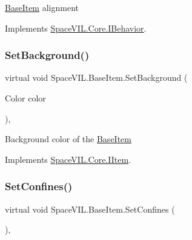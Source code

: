 \mbox{\hyperlink{class_space_v_i_l_1_1_base_item}{Base\+Item}} alignment 



Implements \mbox{\hyperlink{interface_space_v_i_l_1_1_core_1_1_i_behavior}{Space\+V\+I\+L.\+Core.\+I\+Behavior}}.

\mbox{\label{class_space_v_i_l_1_1_base_item_a9ac74dbeeaedbc9dc13edbad28ee1d8c}} 
\subsubsection{\texorpdfstring{Set\+Background()}{SetBackground()}}
{\footnotesize\ttfamily virtual void Space\+V\+I\+L.\+Base\+Item.\+Set\+Background (\begin{DoxyParamCaption}\item[{Color}]{color }\end{DoxyParamCaption})\hspace{0.3cm}{\ttfamily [inline]}, {\ttfamily [virtual]}}



Background color of the \mbox{\hyperlink{class_space_v_i_l_1_1_base_item}{Base\+Item}} 



Implements \mbox{\hyperlink{interface_space_v_i_l_1_1_core_1_1_i_item}{Space\+V\+I\+L.\+Core.\+I\+Item}}.

\mbox{\label{class_space_v_i_l_1_1_base_item_abb2566ee1b68d0e415d003fcb252ca70}} 
\subsubsection{\texorpdfstring{Set\+Confines()}{SetConfines()}}
{\footnotesize\ttfamily virtual void Space\+V\+I\+L.\+Base\+Item.\+Set\+Confines (\begin{DoxyParamCaption}{ }\end{DoxyParamCaption})\hspace{0.3cm}{\ttfamily [inline]}, {\ttfamily [virtual]}}




